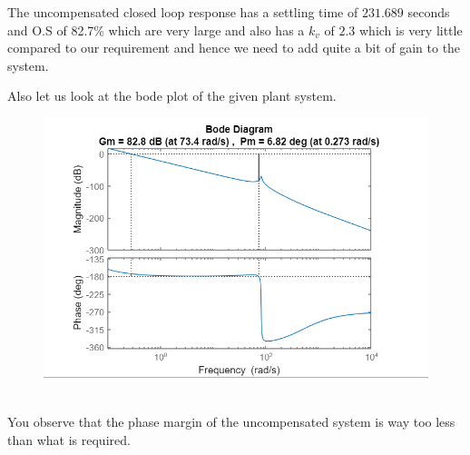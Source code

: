 \documentclass[12pt]{article}
\begin{document}
The uncompensated closed loop response has a settling time of \(231.689\) seconds and O.S of 82.7\% which are very large and also has a \(k_v\) of \(2.3\) which is very little compared to our requirement and hence we need to add quite a bit of gain to the system.\par

\begin{minipage}{0.3\linewidth} \par
  Also let us look at the bode plot of the given plant system.
\end{minipage}%
\hfill
\begin{minipage}{0.65\linewidth}
  \begin{figure}[H]
    \centering
    \includegraphics[width=\linewidth]{images/plot3.png}
    \label{fig:plot_3}
  \end{figure}
\end{minipage} \\[9pt]

You observe that the phase margin of the uncompensated system is way too less than what is required. \\[9pt]
\end{document}
